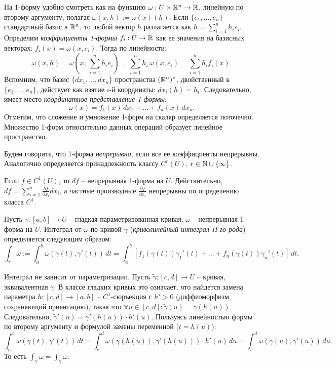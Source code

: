 \begin{note}
	На 1-форму удобно смотреть как на функцию $\omega : U \times \mathbb{R}^n \to \mathbb{R}$, линейную по второму аргументу, полагая $\omega(x, h) := \omega(x)(h)$.
	Если $\{e_1, \dotsc, e_n\}$ -- стандартный базис в $\mathbb{R}^n$, то любой вектор $h$ разлагается как $h = \sum_{i=1}^n h_i e_i$.
	Определим \textit{коэффициенты 1-формы} $f_i : U \to \mathbb{R}$ как ее значения на базисных векторах: $f_i(x) = \omega(x, e_i)$.
	Тогда по линейности:
	\[ \omega(x, h) = \omega\left(x, \, \sum_{i=1}^n h_i e_i\right) = \sum_{i=1}^n h_i \, \omega(x, e_i) = \sum_{i=1}^n h_i f_i(x). \]
	Вспомним, что базис $\{dx_1, \dotsc, dx_n\}$ пространства $(\mathbb{R}^n)^*$, двойственный к $\{e_1, \dotsc, e_n\}$, действует как взятие $i$-й координаты: $dx_i(h) = h_i$. 
	Следовательно, имеет место \textit{координатное представление 1-формы}:
	\[ \omega(x) = f_1(x) \, dx_1 + \dotsc + f_n(x) \, dx_n. \]
	Отметим, что сложение и умножение 1-форм на скаляр определяется поточечно.
	Множество 1-форм относительно данных операций образует линейное пространство.
\end{note}

\begin{definition}
	Будем говорить, что 1-форма \textit{непрерывна}, если все ее коэффициенты непрерывны.
	Аналогично определяется принадлежность классу $C^r(U)$, $r \in \mathbb{N} \cup \{\infty\}$.
\end{definition}


\begin{example}
	Если $f \in C^1(U)$, то $df$ -- непрерывная 1-форма на $U$.
	Действительно, $df = \sum_{i=1}^n \frac{\partial f}{\partial x_i} dx_i$, а частные производные $\frac{\partial f}{\partial x_i}$ непрерывны по определению класса $C^1$.
\end{example}

\begin{definition}
	Пусть $\gamma : [a, b] \to U$ -- гладкая параметризованная кривая, $\omega$ -- непрерывная 1-форма на $U$. 
	Интеграл от $\omega$ по кривой $\gamma$ (\textit{криволинейный интеграл II-го рода}) определяется следующим образом: 
	\[ \int_{\gamma} \omega := \int_{a}^{b} \omega(\gamma(t), \gamma'(t)) \, dt = \int_{a}^{b} \left[ f_1(\gamma(t)) \gamma_1'(t) + \dotsc + f_n(\gamma(t)) \gamma_n'(t) \right] \, dt. \]
\end{definition}

\begin{note}
	Интеграл не зависит от параметризации. 
	Пусть $\widetilde{\gamma} : [c, d] \to U$ -- кривая, эквивалентная $\gamma$. 
	В классе гладких кривых это означает, что найдется замена параметра $h : [c, d] \to [a, b]$ -- $C^1$-сюръекция с $h' > 0$ (диффеоморфизм, сохраняющий ориентацию), такая что $\forall u \in [c, d] : \widetilde{\gamma}(u) = \gamma(h(u))$. 
	Следовательно, $\widetilde{\gamma}'(u) = \gamma'(h(u)) \cdot h'(u)$.
	Пользуясь линейностью формы по второму аргументу и формулой замены переменной ($t = h(u)$):
	\[ \int_{a}^{b} \omega(\gamma(t), \gamma'(t)) \, dt = \int_{c}^{d} \omega(\gamma(h(u)), \gamma'(h(u))) \cdot h'(u) \, du = \int_{c}^{d} \omega(\widetilde{\gamma}(u), \widetilde{\gamma}'(u)) \, du. \]
	То есть $\int_{\gamma} \omega = \int_{\widetilde{\gamma}} \omega$.
\end{note}

